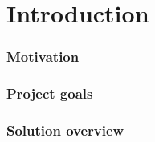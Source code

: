 \chapter*{Introduction}
\label{chap:introduction}
\subsection{Motivation}
\label{subsec:motivation}
\subsection{Project goals}
\label{subsec:project-goals}
\subsection{Solution overview}
\label{subsec:solution-overview}




